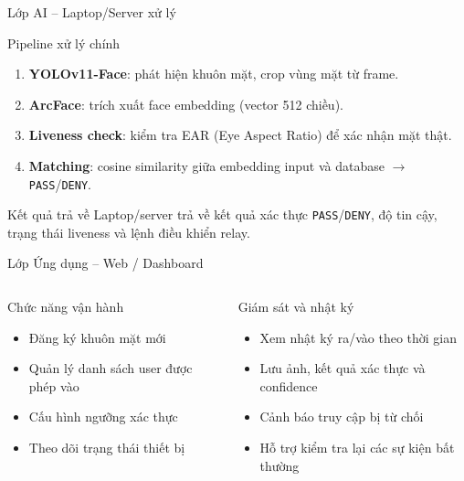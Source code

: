 \documentclass[aspectratio=169]{beamer}
\begin{document}
\begin{frame}{Lớp AI -- Laptop/Server xử lý}
  \begin{block}{Pipeline xử lý chính}
    \begin{enumerate}
      \item \textbf{YOLOv11-Face}: phát hiện khuôn mặt, crop vùng mặt từ frame.
      \item \textbf{ArcFace}: trích xuất face embedding (vector 512 chiều).
      \item \textbf{Liveness check}: kiểm tra EAR (Eye Aspect Ratio) để xác nhận mặt thật.
      \item \textbf{Matching}: cosine similarity giữa embedding input và database $\to$ \texttt{PASS}/\texttt{DENY}.
    \end{enumerate}
  \end{block}

  \vspace{0.3em}
  \begin{alertblock}{Kết quả trả về}
    \small
    Laptop/server trả về kết quả xác thực \texttt{PASS}/\texttt{DENY}, độ tin cậy, trạng thái liveness và lệnh điều khiển relay.
  \end{alertblock}
\end{frame}

\begin{frame}{Lớp Ứng dụng -- Web / Dashboard}
  \begin{columns}[T]
      \begin{block}{Chức năng vận hành}
        \begin{itemize}
          \item Đăng ký khuôn mặt mới
          \item Quản lý danh sách user được phép vào
          \item Cấu hình ngưỡng xác thực
          \item Theo dõi trạng thái thiết bị
        \end{itemize}
      \end{block}

      \begin{block}{Giám sát và nhật ký}
        \begin{itemize}
          \item Xem nhật ký ra/vào theo thời gian
          \item Lưu ảnh, kết quả xác thực và confidence
          \item Cảnh báo truy cập bị từ chối
          \item Hỗ trợ kiểm tra lại các sự kiện bất thường
        \end{itemize}
      \end{block}
  \end{columns}
\end{frame}
\end{document}
